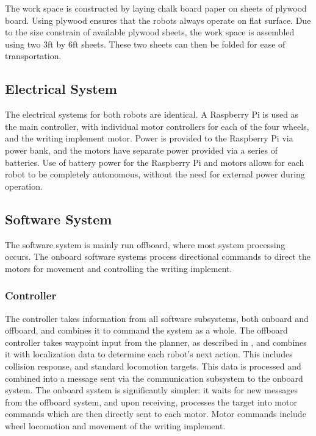 The work space is constructed by laying chalk board paper on sheets of plywood board. Using plywood ensures that the robots always operate on flat surface. Due to the size constrain of available plywood sheets, the work space is assembled using two 3ft by 6ft sheets. These two sheets can then be folded for ease of transportation. 

\subsection{Electrical System}
\label{sec:electrical}
The electrical systems for both robots are identical. A Raspberry Pi is used as the main controller, with individual motor controllers for each of the four wheels, and the writing implement motor. Power is provided to the Raspberry Pi via power bank, and the motors have separate power provided via a series of batteries. Use of battery power for the Raspberry Pi and motors allows for each robot to be completely autonomous, without the need for external power during operation.

\subsection{Software System}
\label{sec:software}
The software system is mainly run offboard, where most system processing occurs. The onboard software systems process directional commands to direct the motors for movement and controlling the writing implement.

\subsubsection{Controller}
\label{sec:sw_controller}
The controller takes information from all software subsystems, both onboard and offboard, and combines it to command the system as a whole. The offboard controller takes waypoint input from the planner, as described in , and combines it with localization data to determine each robot's next action. This includes collision response, and standard locomotion targets. This data is processed and combined into a message sent via the communication subsystem to the onboard system. The onboard system is significantly simpler: it waits for new messages from the offboard system, and upon receiving, processes the target into motor commands which are then directly sent to each motor. Motor commands include wheel locomotion and movement of the writing implement.

